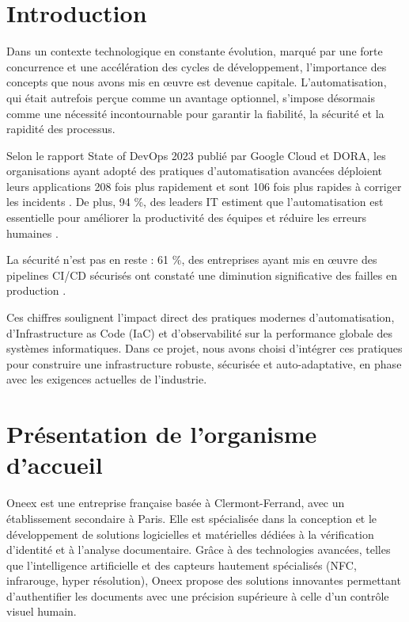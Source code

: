 \thispagestyle{mainmatter}

\section{Introduction}

Dans un contexte technologique en constante évolution, marqué par une forte concurrence et une accélération des cycles de développement, l’importance des concepts que nous avons mis en œuvre est devenue capitale. L’automatisation, qui était autrefois perçue comme un avantage optionnel, s’impose désormais comme une nécessité incontournable pour garantir la fiabilité, la sécurité et la rapidité des processus.

Selon le rapport State of DevOps 2023 publié par Google Cloud et DORA, les organisations ayant adopté des pratiques d’automatisation avancées déploient leurs applications 208 fois plus rapidement et sont 106 fois plus rapides à corriger les incidents \cite{dora2023}. De plus, 94 \%, des leaders IT estiment que l’automatisation est essentielle pour améliorer la productivité des équipes et réduire les erreurs humaines \cite{redhat2023}.

La sécurité n’est pas en reste : 61 \%, des entreprises ayant mis en œuvre des pipelines CI/CD sécurisés ont constaté une diminution significative des failles en production \cite{gitlab2023}.

Ces chiffres soulignent l’impact direct des pratiques modernes d’automatisation, d’Infrastructure as Code (IaC) et d’observabilité sur la performance globale des systèmes informatiques. Dans ce projet, nous avons choisi d’intégrer ces pratiques pour construire une infrastructure robuste, sécurisée et auto-adaptative, en phase avec les exigences actuelles de l’industrie.

\section{Présentation de l'organisme d'accueil}

Oneex est une entreprise française basée à Clermont-Ferrand, avec un établissement secondaire à Paris. Elle est spécialisée dans la conception et le développement de solutions logicielles et matérielles dédiées à la vérification d’identité et à l’analyse documentaire. Grâce à des technologies avancées, telles que l’intelligence artificielle et des capteurs hautement spécialisés (NFC, infrarouge, hyper résolution), Oneex propose des solutions innovantes permettant d’authentifier les documents avec une précision supérieure à celle d’un contrôle visuel humain.

